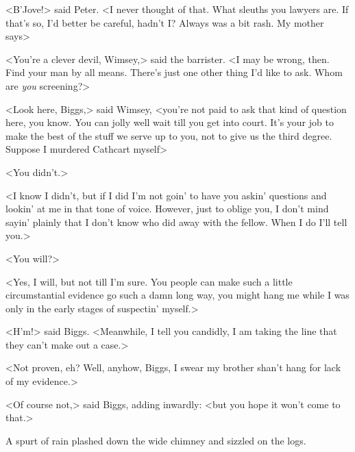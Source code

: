 <B'Jove!> said Peter. <I never thought of that. What sleuths you lawyers are. If that's so, I'd better be careful, hadn't I\@? Always was a bit rash. My mother says\longdash>

<You're a clever devil, Wimsey,> said the barrister. <I may be wrong, then. Find your man by all means. There's just one other thing I'd like to ask. Whom are \emph{you} screening?>

<Look here, Biggs,> said Wimsey, <you're not paid to ask that kind of question here, you know. You can jolly well wait till you get into court. It's your job to make the best of the stuff we serve up to you, not to give us the third degree. Suppose I murdered Cathcart myself\longdash>

<You didn't.>

<I know I didn't, but if I did I'm not goin' to have you askin' questions and lookin' at me in that tone of voice. However, just to oblige you, I don't mind sayin' plainly that I don't know who did away with the fellow. When I do I'll tell you.>

<You will?>

<Yes, I will, but not till I'm sure. You people can make such a little circumstantial evidence go such a damn long way, you might hang me while I was only in the early stages of suspectin' myself.>

<H'm!> said Biggs. <Meanwhile, I tell you candidly, I am taking the line that they can't make out a case.>

<Not proven, eh? Well, anyhow, Biggs, I swear my brother shan't hang for lack of my evidence.>

<Of course not,> said Biggs, adding inwardly: <but you hope it won't come to that.>

A spurt of rain plashed down the wide chimney and sizzled on the logs.

\divider

